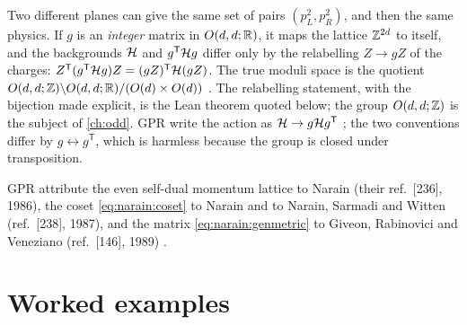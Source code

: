 \begin{pitfallbox}
Two different planes can give the same set of pairs $(p_L^2,p_R^2)$, and then the same
physics. If $g$ is an \emph{integer} matrix in $O(d,d;\mathbb{R})$, it maps the lattice $\mathbb{Z}^{2d}$ to
itself, and the backgrounds $\mathcal{H}$ and $g^{\mathsf T}\mathcal{H} g$ differ only by the relabelling
$Z\to gZ$ of the charges: $Z^{\mathsf T}(g^{\mathsf T}\mathcal{H} g)Z=(gZ)^{\mathsf T}\mathcal{H}(gZ)$. The true moduli
space is the quotient $O(d,d;\mathbb{Z})\backslash O(d,d;\mathbb{R})/(O(d)\times O(d))$
. The relabelling statement, with the bijection
made explicit, is the Lean theorem  quoted below; the group
$O(d,d;\mathbb{Z})$ is the subject of \cref{ch:odd}. GPR write the action as $\mathcal{H}\to g\mathcal{H} g^{\mathsf T}$
; the two conventions differ by
$g\leftrightarrow g^{\mathsf T}$, which is harmless because the group is closed under
transposition.
\end{pitfallbox}

\begin{historybox}
GPR attribute the even self-dual momentum lattice to Narain (their ref.~[236], 1986), the
coset \eqref{eq:narain:coset} to Narain and to Narain, Sarmadi and Witten (ref.~[238], 1987),
and the matrix \eqref{eq:narain:genmetric} to Giveon, Rabinovici and Veneziano (ref.~[146],
1989) .
\end{historybox}

\section{Worked examples}\label{sec:narain:examples}

